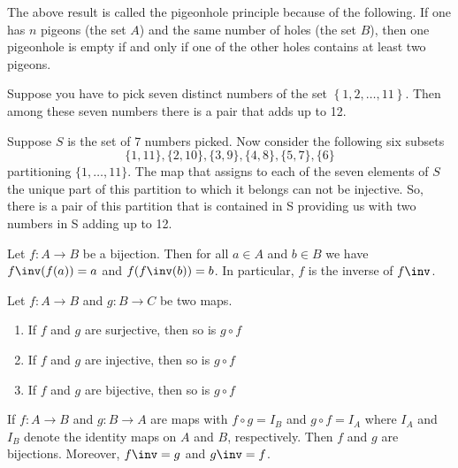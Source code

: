 \begin{remark}
    The above result is called the pigeonhole principle because of the following.
    If one has $n$ pigeons (the set $A$) and the same number of holes (the set $B$),
    then one pigeonhole is empty if and only if one of the other holes contains at
    least two pigeons.
\end{remark}

\begin{example}
    Suppose you have to pick seven distinct numbers of the set
    $\left\{1,2,\dots,11\right\}$. Then among these seven numbers there is a pair
    that adds up to 12.

    Suppose $S$ is the set of 7 numbers picked. Now consider the following six
    subsets $$ \{1, 11\},\{2, 10\},\{3, 9\},\{4, 8\},\{5, 7\},\{6\} $$ partitioning
    $ \{1,\dots,11\} $. The map that assigns to each of the seven elements of $S$
    the unique part of this partition to which it belongs can not be injective.
    So, there is a pair of this partition that is contained in S providing us
    with two numbers in S adding up to 12.
\end{example}

\begin{proposition}
    Let $ f:A \to B $ be a bijection. Then for all $ a \in A $ and $ b \in B $
    we have $ f\inv(f(a)) = a $ and $ f(f\inv(b)) = b $. In particular, $f$ is the
    inverse of $ f\inv $.
\end{proposition}

\begin{theorem}
    Let $ f: A \to B $ and $ g: B \to C $ be two maps.
    \begin{enumerate}[label=(\alph*)]
        \item If $f$ and $g$ are surjective, then so is $ g \circ f $
        \item If $f$ and $g$ are injective, then so is $ g \circ f $
        \item If $f$ and $g$ are bijective, then so is $ g \circ f $
    \end{enumerate}
\end{theorem}

\begin{proposition}
    If $ f:A \to B $ and $ g:B \to A $ are maps with $ f \circ g = I_B $ and
    $ g \circ f = I_A $ where $I_A$ and $I_B$ denote the identity maps on $A$
    and $B$, respectively. Then $f$ and $g$ are bijections. Moreover, $ f\inv = g $
    and $ g\inv = f $.
\end{proposition}

